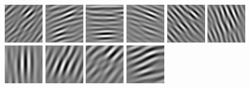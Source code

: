 \begin{figure}
\begin{center}
  \includegraphics[scale=0.5]{ch4/figures/imag_2_2.jpg}
  \includegraphics[scale=0.5]{ch4/figures/imag_2_3.jpg}
  \includegraphics[scale=0.5]{ch4/figures/imag_2_4.jpg}
  \includegraphics[scale=0.5]{ch4/figures/imag_2_5.jpg}
  \includegraphics[scale=0.5]{ch4/figures/imag_2_6.jpg}
  \includegraphics[scale=0.5]{ch4/figures/imag_2_7.jpg}\\
  \includegraphics[scale=0.5]{ch4/figures/imag_3_0.jpg}
  \includegraphics[scale=0.5]{ch4/figures/imag_3_1.jpg}
  \includegraphics[scale=0.5]{ch4/figures/imag_3_2.jpg}
  \includegraphics[scale=0.5]{ch4/figures/imag_3_3.jpg}

\end{center}
\end{figure}
